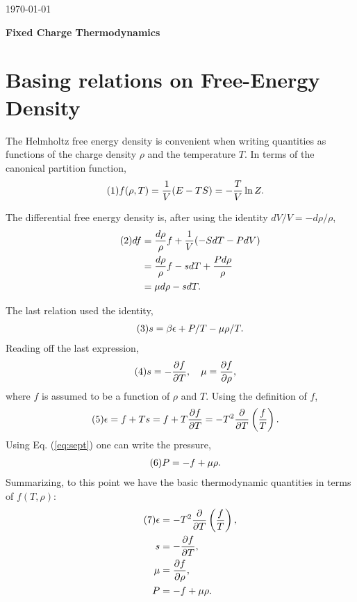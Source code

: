 \documentclass[12pt]{article}
\numberwithin{equation}{section}
\numberwithin{figure}{section}
\newcommand\eqnumber{\addtocounter{equation}{1}\tag{\theequation}}
\begin{document}
\today\\

\centerline{\bf \large Fixed Charge Thermodynamics}

\section{Basing relations on Free-Energy Density}

The Helmholtz free energy density is convenient when writing quantities as functions of the charge density $\rho$ and the temperature $T$. In terms of the canonical partition function,
\begin{align*}\eqnumber
f(\rho,T)&=\frac{1}{V}(E-TS)=-\frac{T}{V}\ln Z.
\end{align*}

The differential free energy density is, after using the identity $dV/V=-d\rho/\rho$,
\begin{align*}\eqnumber
df&=\frac{d\rho}{\rho}f+\frac{1}{V}(-SdT-PdV)\\
&=\frac{d\rho}{\rho}f-sdT+\frac{Pd\rho}{\rho}\\
&=\mu d\rho-sdT.
\end{align*}

The last relation used the identity,
\begin{align*}\eqnumber\label{eq:sept}
s=\beta\epsilon+P/T-\mu\rho/T.
\end{align*}
Reading off the last expression,
\begin{align*}\eqnumber
s&=-\frac{\partial f}{\partial T},~~~\mu=\frac{\partial f}{\partial\rho},
\end{align*}
where $f$ is assumed to be a function of $\rho$ and $T$. Using the definition of $f$,
\begin{align*}\eqnumber
\epsilon&=f+Ts=f+T\frac{\partial f}{\partial T}=-T^2\frac{\partial}{\partial T}\left(\frac{f}{T}\right).
\end{align*}
Using Eq. (\ref{eq:sept}) one can write the pressure,
\begin{align*}\eqnumber
P&=-f+\mu\rho.
\end{align*}
Summarizing, to this point we have the basic thermodynamic quantities in terms of $f(T,\rho)$:
\begin{align*}\eqnumber
\epsilon&=-T^2\frac{\partial}{\partial T}\left(\frac{f}{T}\right),\\
s&=-\frac{\partial f}{\partial T},\\
\mu&=\frac{\partial f}{\partial \rho},\\
P&=-f+\mu\rho.
\end{align*}
\end{document}
